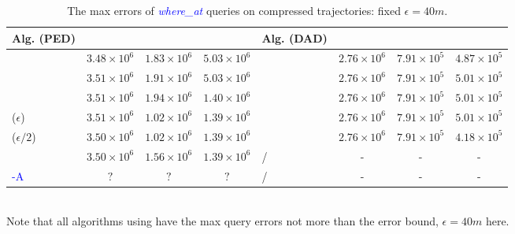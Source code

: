 {\begin{table}
	\caption{\small The max errors of \textcolor{blue}{\emph{where\_at}} queries on compressed trajectories: fixed $\epsilon=40m$.}
	\centering
	\scriptsize
	\vspace{-1ex}
	\begin{tabular}{|l|c|c|c|l|c|c|c|}
		\hline
		\bf{Alg. (PED)}  &\ucar &\geolife &\mopsi & \bf{Alg. (DAD)}  &\ucar &\geolife &\mopsi \\
		\hline
		{\dpa} &	$3.48 \times 10^6$ & $1.83 \times 10^6$ &	$5.03 \times 10^6$	& \dpa	& $2.76 \times 10^6$	& $7.91 \times 10^5$	& $4.87 \times 10^5$ \\
		\hline
		{\tpa} &	$3.51 \times 10^6$ & $1.91 \times 10^6$ &	$5.03 \times 10^6$	& \tpa	& $2.76 \times 10^6$	& $7.91 \times 10^5$	& $5.01 \times 10^5$ \\
		\hline
		{\bqsa} &	$3.51 \times 10^6$ & $1.94 \times 10^6$ &	$1.40 \times 10^6$	& \opwa	& $2.76 \times 10^6$	& $7.91 \times 10^5$	& $5.01 \times 10^5$ \\
		\hline
		{\siped($\epsilon$)} &	$3.51 \times 10^6$ & $1.02 \times 10^6$ &	$1.39 \times 10^6$	& \interval	& $2.76 \times 10^6$	& $7.91 \times 10^5$	& $5.01 \times 10^5$ \\
		\hline
		{\siped($\epsilon/2$)} &	$3.50 \times 10^6$ & $1.02 \times 10^6$ &	$1.39 \times 10^6$	& \intersec	& $2.76 \times 10^6$	& $7.91 \times 10^5$	& $4.18 \times 10^5$ \\
		\hline
		{\operb} &	$3.50 \times 10^6$ & $1.56 \times 10^6$ &	$1.39 \times 10^6$	& / & -  & - & -  \\
		\hline
		\textcolor{blue}{\operb-A} &	${?} $ & ${?} $ & ${?} $ & / &- &- &- \\
		\hline
	\end{tabular}
	\label{tab:query-me}
	\vspace{0.5ex}
	\\{Note that all algorithms using \sed have the max query errors not more than the error bound, \ie $\epsilon=40m$ here.}
	\vspace{-1ex}
\end{table}


}
